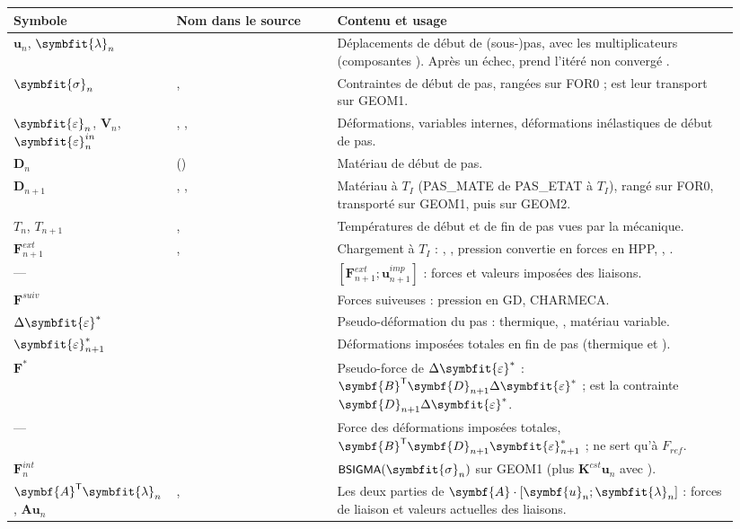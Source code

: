 \documentclass[11pt,a4paper]{article}
\makeatletter
\numberwithin{equation}{section}
\newcommand{\src}[1]{\texttt{\detokenize{#1}}}          %
\newcommand{\pr}[1]{\textsf{#1}}                        %
\newcommand{\op}[1]{\textsf{\small #1}}                 %
\newcommand{\vc}[1]{\symbf{#1}}                         %
\newcommand{\eps}{\varepsilon}
\newcommand{\Deps}{\Delta\symbfit{\varepsilon}}
\newcommand{\sig}{\symbfit{\sigma}}
\newcommand{\vg}[1]{\symbfit{#1}}                       %
\newenvironment{glossaire}[1][Glossaire]{%
  \par\smallskip\needspace{7\baselineskip}\noindent{\sffamily\bfseries\small #1}\par\nopagebreak
  \small
  \renewcommand{\arraystretch}{1.18}
  \begin{longtable}{@{}>{\raggedright\arraybackslash}p{0.17\linewidth}
                     >{\raggedright\arraybackslash}p{0.22\linewidth}
                     >{\raggedright\arraybackslash}p{0.555\linewidth}@{}}
  \toprule
  \textbf{Symbole} & \textbf{Nom dans le source} & \textbf{Contenu et usage}\\
  \midrule\endhead
  \bottomrule\endfoot}
  {\end{longtable}\addtocounter{table}{-1}\normalsize\vspace{-0.4em}}
\makeatother
\begin{document}
\begin{glossaire}
$\vc u_n$, $\vg\lambda_n$ & \src{ZDEP0} & Déplacements de début de (sous-)pas, avec les multiplicateurs (composantes \src{LX}). Après un échec, \src{ZDEP0} prend l'itéré non convergé \src{ZDETOT}.\\
$\sig_n$ & \src{ZSIG0}, \src{ZSIG1} & Contraintes de début de pas, rangées sur FOR0 ; \src{ZSIG1} est leur transport sur GEOM1.\\
$\vg\eps_n$, $\vc V_n$, $\vg\eps^{in}_n$ & \src{ZDEF0}, \src{ZVAR0}, \src{ZDEI0} & Déformations, variables internes, déformations inélastiques de début de pas.\\
$\vc D_n$ & \src{ZMAT1} (\src{WTAB.'MAT1'}) & Matériau de début de pas.\\
$\vc D_{n+1}$ & \src{ZMAT20}, \src{ZMAT21}, \src{ZMAT22} & Matériau à $T_I$ (\pr{PAS\_MATE} de \pr{PAS\_ETAT} à $T_I$), rangé sur FOR0, transporté sur GEOM1, puis sur GEOM2.\\
$T_n$, $T_{n+1}$ & \src{ZTEMP1}, \src{ZTEMP2} & Températures de début et de fin de pas vues par la mécanique.\\
$\vc F^{ext}_{n+1}$ & \src{ZFEXT2}, \src{ZFEXT} & Chargement à $T_I$ : \src{MECA}, \src{FORC}, pression convertie en forces en HPP, \src{DIMP}, \src{DINC}.\\
— & \src{ZFCONSTA} & $[\vc F^{ext}_{n+1} ; \vc u^{imp}_{n+1}]$ : forces et valeurs imposées des liaisons.\\
$\vc F^{suiv}$ & \src{ZFSUIV} & Forces suiveuses : pression en GD, \pr{CHARMECA}.\\
$\Deps^{*}$ & \src{DEPSI} & Pseudo-déformation du pas : thermique, \src{DEFI}, matériau variable.\\
$\vg\eps^{*}_{n+1}$ & \src{EPSIF} & Déformations imposées totales en fin de pas (thermique et \src{DEFI}).\\
$\vc F^{*}$ & \src{DFDEF} & Pseudo-force de $\Deps^{*}$ : $\vc B^{\mathsf T}\vc D_{n+1}\Deps^{*}$ ; \src{DSIGM} est la contrainte $\vc D_{n+1}\Deps^{*}$.\\
— & \src{FSIGF} & Force des déformations imposées totales, $\vc B^{\mathsf T}\vc D_{n+1}\vg\eps^{*}_{n+1}$ ; ne sert qu'à $F_{ref}$.\\
$\vc F^{int}_n$ & \src{ZF1} & $\op{BSIGMA}(\sig_n)$ sur GEOM1 (plus $\vc K^{cst}\vc u_n$ avec \src{RIGIDITE_CONSTANTE}).\\
$\vc A^{\mathsf T}\vg\lambda_n$, $\vc A\vc u_n$ & \src{FREAP}, \src{FLXINI} & Les deux parties de $\vc A\cdot[\vc u_n ; \vg\lambda_n]$ : forces de liaison et valeurs actuelles des liaisons.\\

\end{glossaire}
\end{document}
